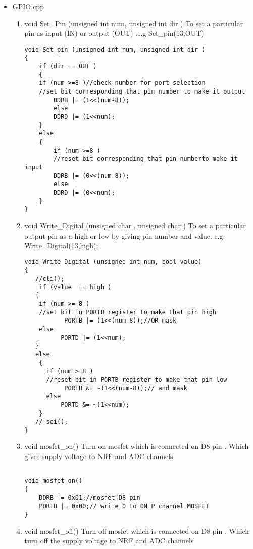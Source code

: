 \documentclass{article}
\begin{document}
\begin{itemize}
\item GPIO.cpp 
\begin{enumerate}
\item void Set\_Pin (unsigned int num, unsigned int dir )
\newline
To set a particular pin as input (IN)
   or output (OUT) .e.g Set\_pin(13,OUT)
\begin{lstlisting}
void Set_pin (unsigned int num, unsigned int dir )
{
	if (dir == OUT )
	{  
    if (num >=8 )//check number for port selection
    //set bit corresponding that pin number to make it output
		DDRB |= (1<<(num-8));
		else
		DDRD |= (1<<num);
	}
	else
	{
		if (num >=8 )
        //reset bit corresponding that pin numberto make it input
		DDRB |= (0<<(num-8));
		else
		DDRD |= (0<<num);
	}
}
\end{lstlisting}
\item void Write\_Digital (unsigned char , unsigned char )
\newline  To set a particular output pin as a high or low by giving pin number and value.
\newline   e.g. Write\_Digital(13,high);
 \begin{lstlisting}
void Write_Digital (unsigned int num, bool value)
{
   //cli();
    if (value  == high )
   {  
    if (num >= 8 )
    //set bit in PORTB register to make that pin high
           PORTB |= (1<<(num-8));//OR mask
    else 
          PORTD |= (1<<num);
   }
   else 
    { 
      if (num >=8 )
      //reset bit in PORTB register to make that pin low
           PORTB &= ~(1<<(num-8));// and mask
      else 
          PORTD &= ~(1<<num);
    }
   // sei();
}
\end{lstlisting}

\item void mosfet\_on()
\newline Turn on mosfet which is connected on D8 pin .
Which gives supply voltage to NRF and ADC channels
 \begin{lstlisting}

void mosfet_on()
{
	DDRB |= 0x01;//mosfet D8 pin
	PORTB |= 0x00;// write 0 to ON P channel MOSFET
}
\end{lstlisting}


\item void mosfet\_off()
\newline Turn off mosfet which is connected on D8 pin .
Which turn off the supply voltage to NRF and ADC channels
 \begin{lstlisting}


\end{lstlisting}
\end{enumerate}
\end{itemize}
\end{document}
